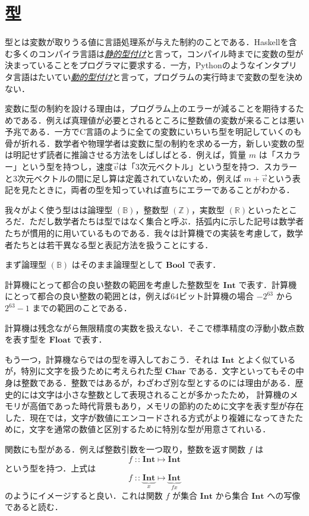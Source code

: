 \documentclass[a4paper,draft]{jsbook}
\newcommand{\programminglanguage}[1]{\textsf{#1}}
\newcommand{\clang}{\programminglanguage{C}}
\newcommand{\haskell}{\programminglanguage{Haskell}}
\newcommand{\python}{\programminglanguage{Python}}
\newcommand{\keyword}[1]{{\underline{\emph{#1}}}}
\newcommand{\mSpecialSet}[1]{\mathbb{#1}} %
\newcommand{\mRSet}{\mSpecialSet{R}}
\newcommand{\mZSet}{\mSpecialSet{Z}}
\newcommand{\mBSet}{\mSpecialSet{B}}
\newcommand{\mType}[1]{\mathbf{#1}}
\newcommand{\mBoolType}{\mType{Bool}}
\newcommand{\mCharType}{\mType{Char}}
\newcommand{\mIntType}{\mType{Int}}
\newcommand{\mFloatType}{\mType{Float}}
\DeclareMathOperator{\mIn}{{:\!:}}
\DeclareMathOperator{\mMapsTo}{\mapsto}
\newcommand{\mProjection}[2]{#1\mMapsTo#2}
\begin{document}
\section{型}

型とは変数が取りうる値に言語処理系が与えた制約のことである．\haskell を含む多くのコンパイラ言語は\keyword{静的型付け}と言って，コンパイル時までに変数の型が決まっていることをプログラマに要求する．一方，\python のようなインタプリタ言語はたいてい\keyword{動的型付け}と言って，プログラムの実行時まで変数の型を決めない．

変数に型の制約を設ける理由は，プログラム上のエラーが減ることを期待するためである．例えば真理値が必要とされるところに整数値の変数が来ることは悪い予兆である．一方で\clang 言語のように全ての変数にいちいち型を明記していくのも骨が折れる．数学者や物理学者は変数に型の制約を求める一方，新しい変数の型は明記せず読者に推論させる方法をしばしばとる．例えば，質量 $m$ は「スカラー」という型を持つし，速度$\vec{v}$は「3次元ベクトル」という型を持つ．スカラーと3次元ベクトルの間に足し算は定義されていないため，例えば $m+\vec{v}$という表記を見たときに，両者の型を知っていれば直ちにエラーであることがわかる．

我々がよく使う型はは論理型 $(\mBSet)$，整数型 $(\mZSet)$，実数型 $(\mRSet)$といったところだ．ただし数学者たちは型ではなく集合と呼ぶ．括弧内に示した記号は数学者たちが慣用的に用いているものである．我々は計算機での実装を考慮して，数学者たちとは若干異なる型と表記方法を扱うことにする．

まず論理型 $(\mBSet)$ はそのまま論理型として $\mBoolType$ で表す．

計算機にとって都合の良い整数の範囲を考慮した整数型を $\mIntType$ で表す．計算機にとって都合の良い整数の範囲とは，例えば64ビット計算機の場合 $-2^{63}$ から $2^{63}-1$ までの範囲のことである．

計算機は残念ながら無限精度の実数を扱えない．そこで標準精度の浮動小数点数を表す型を $\mFloatType$ で表す．

もう一つ，計算機ならではの型を導入しておこう．それは $\mIntType$ とよく似ているが，特別に文字を扱うために考えられた型 $\mCharType$ である．文字といってもその中身は整数である．整数ではあるが，わざわざ別な型とするのには理由がある．歴史的には文字は小さな整数として表現されることが多かったため，
計算機のメモリが高価であった時代背景もあり，メモリの節約のために文字を表す型が存在した．現在では，文字が数値にエンコードされる方式がより複雑になってきたために，文字を通常の数値と区別するために特別な型が用意さてれいる．

関数にも型がある．例えば整数引数を一つ取り，整数を返す関数 $f$ は
\begin{equation}
f\mIn\mProjection{\mIntType}{\mIntType}
\end{equation}
という型を持つ．上式は
\begin{equation}
f
\mIn\underbrace{\mIntType}_{x}
\mMapsTo
\underbrace{\mIntType}_{fx}
\end{equation}
のようにイメージすると良い．これは関数 $f$ が集合 $\mIntType$ から集合 $\mIntType$ への写像であると読む．
\end{document}
